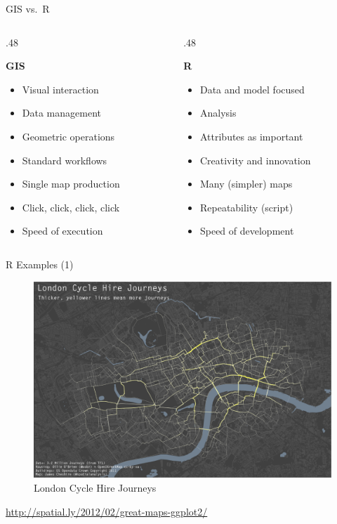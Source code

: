 \documentclass[10pt,ignorenonframetext,]{beamer}
\providecommand{\tightlist}{%
  \setlength{\itemsep}{0pt}\setlength{\parskip}{0pt}}
\def\begincols{\begin{columns}}
\def\begincol{\begin{column}}
\def\endcol{\end{column}}
\def\endcols{\end{columns}}
\begin{document}
\begin{frame}{GIS vs.~R}

\begincols
\begincol{.48\textwidth}

\textbf{GIS}

\begin{itemize}
\tightlist
\item
  Visual interaction
\item
  Data management
\item
  Geometric operations
\item
  Standard workflows
\item
  Single map production
\item
  Click, click, click, click
\item
  Speed of execution
\end{itemize}

\endcol
\begincol{.48\textwidth}

\textbf{R}

\begin{itemize}
\tightlist
\item
  Data and model focused
\item
  Analysis
\item
  Attributes as important
\item
  Creativity and innovation
\item
  Many (simpler) maps
\item
  Repeatability (script)
\item
  Speed of development
\end{itemize}

\endcol
\endcols

\end{frame}

\begin{frame}{R Examples (1)}

\begin{figure}

{\centering \includegraphics[width=0.75\linewidth]{../images/bike_ggplot} 

}

\caption{London Cycle Hire Journeys}\label{fig:unnamed-chunk-4}
\end{figure}

\url{http://spatial.ly/2012/02/great-maps-ggplot2/}

\end{frame}
\end{document}
